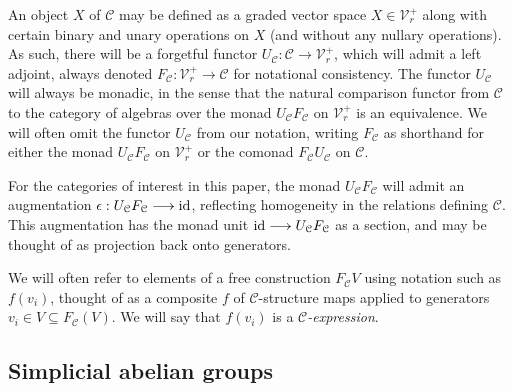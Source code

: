 \documentclass[11pt]{amsart}
\theoremstyle{plain}
\theoremstyle{definition}
\renewcommand{\to}{\longrightarrow}
\newcommand{\calC}{\mathcal{C}}
\newcommand{\calV}{\mathcal{V}}
\theoremstyle{plain}
\newcommand{\vect}[2]{\calV^{#1}_{#2}}
\newcommand{\Id}{\textup{id}}
\begin{document}
\begin{Conventions and notation}
An object $X$ of $\calC$ may be defined as a graded vector space $X\in\vect{+}{r}$ along with certain binary and unary operations on $X$ (and without any nullary operations). As such, there will be a forgetful functor $U_\calC:\calC\to\vect{+}{r}$, which will admit a left adjoint, always denoted $F_\calC:\vect{+}{r}\to\calC$ for notational consistency. The functor $U_{\calC}$ will always be monadic, in the sense that the natural comparison functor from $\calC$ to the category of algebras over the monad $U_{\calC}F_{\calC}$ on $\vect{+}{r}$ is an equivalence. We will often omit the functor $U_{\calC}$ from our notation, writing $F_{\calC}$ as shorthand for either the monad $U_{\calC}F_{\calC}$ on $\vect{+}{r}$ or the comonad $F_{\calC}U_{\calC}$ on $\calC$.

For the categories of interest in this paper, the monad $U_{\calC}F_{\calC}$ will admit an augmentation $\epsilon:U_{\calC}F_{\calC}\to\Id$, reflecting homogeneity in the relations defining $\calC$. This augmentation has the monad unit $\Id\to U_{\calC}F_{\calC}$ as a section, and may be thought of as projection back onto generators.

We will often refer to elements of a free construction $F_\calC V$ using notation such as $f(v_i)$, thought of as a composite $f$ of $\calC$-structure maps applied to generators $v_i\in V\subseteq F_\calC(V)$. We will say that $f(v_i)$ is a \emph{$\calC$-expression}.



\subsection{Simplicial abelian groups}


\end{Conventions and notation}
\end{document}

